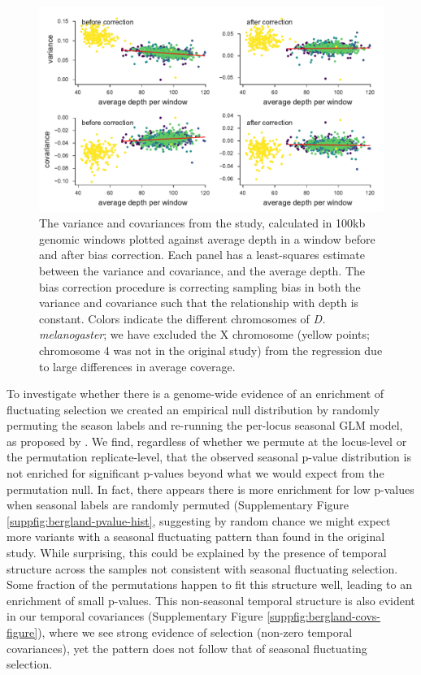 \documentclass[11pt]{article}
\begin{document}
\begin{figure}[!ht]
  \centering
  \includegraphics[width=\textwidth]{figures/bergland-correction-plot.pdf}

  \caption{The variance and covariances from the \textcite{Bergland2014-ij}
    study, calculated in 100kb genomic windows plotted against average depth in
    a window before and after bias correction. Each panel has a least-squares
    estimate between the variance and covariance, and the average depth.
    The bias correction procedure is correcting sampling bias in both the variance
    and covariance such that the relationship with depth is constant. Colors
    indicate the different chromosomes of \emph{D. melanogaster}; we have
    excluded the X chromosome (yellow points; chromosome 4 was not in the
    original study) from the regression due to large differences in average
    coverage.}

  \label{suppfig:bergland-correction}
\end{figure}



To investigate whether there is a genome-wide evidence of an enrichment of
fluctuating selection we created an empirical null distribution by randomly
permuting the season labels and re-running the per-locus seasonal GLM model, as
proposed by \textcite{Machado2018-cs}. We find, regardless of whether we
permute at the locus-level or the permutation replicate-level, that the
observed seasonal p-value distribution \textcite{Bergland2014-ij} is not
enriched for significant p-values beyond what we would expect from the
permutation null. In fact, there appears there is more enrichment for low
p-values when seasonal labels are randomly permuted (Supplementary Figure
\ref{suppfig:bergland-pvalue-hist}, suggesting by random chance we might expect
more variants with a seasonal fluctuating pattern than found in the original
\textcite{Bergland2014-ij} study. While surprising, this could be explained by
the presence of temporal structure across the samples not consistent with
seasonal fluctuating selection. Some fraction of the permutations happen to fit
this structure well, leading to an enrichment of small p-values. This
non-seasonal temporal structure is also evident in our temporal covariances
(Supplementary Figure \ref{suppfig:bergland-covs-figure}), where we see strong
evidence of selection (non-zero temporal covariances), yet the pattern does not
follow that of seasonal fluctuating selection.  
\end{document}

